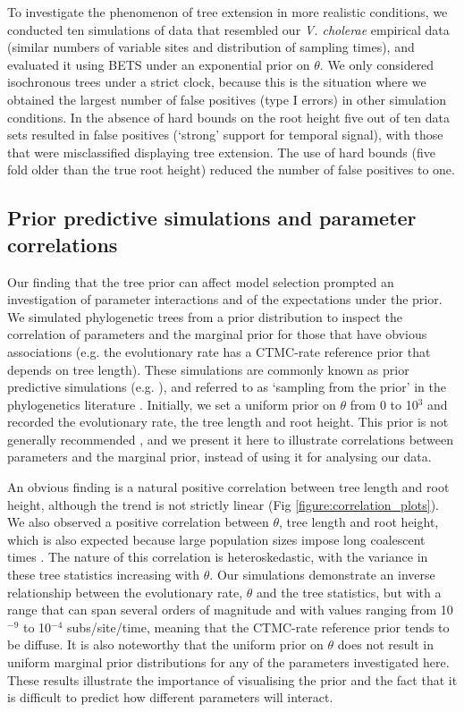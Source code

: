 \documentclass[10pt,letterpaper]{article}
\begin{document}
{To investigate the phenomenon of tree extension in more realistic conditions, we conducted ten simulations of data that resembled our \textit{V. cholerae} empirical data (similar numbers of variable sites and distribution of sampling times), and evaluated it using BETS under an exponential prior on $\theta$. We only considered isochronous trees under a strict clock, because this is the situation where we obtained the largest number of false positives (type I errors) in other simulation conditions. In the absence of hard bounds on the root height five out of ten data sets resulted in false positives (`strong' support for temporal signal), with those that were misclassified displaying tree extension. The use of hard bounds (five fold older than the true root height) reduced the number of false positives to one.} 

\subsection*{Prior predictive simulations and parameter correlations}
Our finding that the tree prior can affect model selection prompted an investigation of parameter interactions and of the expectations under the prior. We simulated phylogenetic trees from a prior distribution to inspect the correlation of parameters and the marginal prior for those that have obvious associations (e.g. the evolutionary rate has a CTMC-rate reference prior that depends on tree length). These simulations are commonly known as prior predictive simulations (e.g. \cite{wesner2021choosing}), and referred to as `sampling from the prior' in the phylogenetics literature \cite{nascimento2017biologist}. Initially, we set a uniform prior on $\theta$ from 0 to 10$^3$ and recorded the evolutionary rate, the tree length and root height. This prior is not generally recommended \cite{bouckaertDating}, and we present it here to illustrate correlations between parameters and the marginal prior, instead of using it for analysing our data.

An obvious finding is a natural positive correlation between tree length and root height, although the trend is not strictly linear (Fig \ref{figure:correlation_plots}). We also observed a positive correlation between $\theta$, tree length and root height, which is also expected because large population sizes impose long coalescent times \cite{rosenberg2002genealogical}. The nature of this correlation is heteroskedastic, with the variance in these tree statistics increasing with $\theta$. Our simulations demonstrate an inverse relationship between the evolutionary rate, $\theta$ and the tree statistics, but with a range that can span several orders of magnitude and with values ranging from 10$^{-9}$ to 10$^{-4}$ subs/site/time, meaning that the CTMC-rate reference prior tends to be diffuse. It is also noteworthy that the uniform prior on $\theta$ does not result in uniform marginal prior distributions for any of the parameters investigated here. These results illustrate the importance of visualising the prior and the fact that it is difficult to predict how different parameters will interact.
\end{document}
